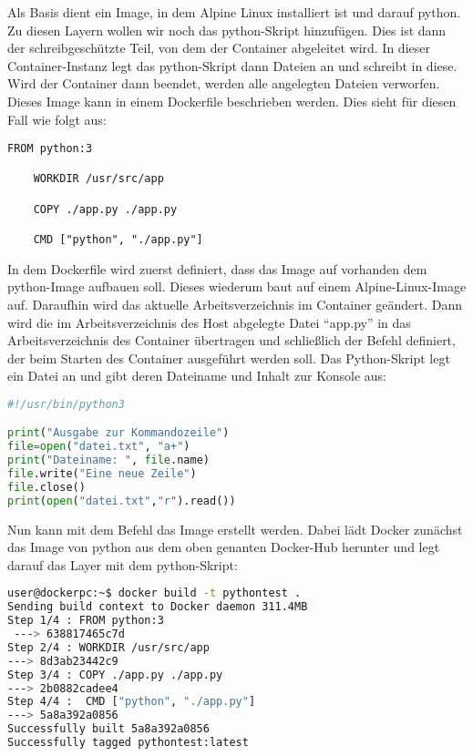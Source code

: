 Als Basis dient ein Image, in dem Alpine Linux installiert ist und darauf python. Zu diesen Layern wollen wir noch das python-Skript hinzufügen. Dies ist dann der schreibgeschützte Teil, von dem der Container abgeleitet wird. In dieser Container-Instanz legt das python-Skript dann Dateien an und schreibt in diese. Wird der Container dann beendet, werden alle angelegten Dateien verworfen.\\
Dieses Image kann in einem Dockerfile beschrieben werden. Dies sieht für diesen Fall wie folgt aus:

\begin{lstlisting}[language=docker,caption={Dockerfile},label={code:dockerfile}]
    FROM python:3
    
    WORKDIR /usr/src/app
    
    COPY ./app.py ./app.py
    
    CMD ["python", "./app.py"]
\end{lstlisting}

In dem Dockerfile wird zuerst definiert, dass das Image auf vorhanden dem python-Image aufbauen soll. Dieses wiederum baut auf einem Alpine-Linux-Image auf. Daraufhin wird das aktuelle Arbeitsverzeichnis im Container geändert. Dann wird die im Arbeitsverzeichnis des Host abgelegte Datei "`app.py"' in das Arbeitsverzeichnis des Container übertragen und schließlich der Befehl definiert, der beim Starten des Container ausgeführt werden soll. Das Python-Skript legt ein Datei an und gibt deren Dateiname und Inhalt zur Konsole aus:
\begin{lstlisting}[language=python,caption={app.py},label={code:pythonapp}]
#!/usr/bin/python3

print("Ausgabe zur Kommandozeile")
file=open("datei.txt", "a+")
print("Dateiname: ", file.name)
file.write("Eine neue Zeile")
file.close()
print(open("datei.txt","r").read())
\end{lstlisting}
Nun kann mit dem Befehl  das Image erstellt werden. Dabei lädt Docker zunächst das Image von python aus dem oben genanten Docker-Hub herunter und legt darauf das Layer mit dem python-Skript:

\begin{lstlisting}[language=bash,caption={Terminalausgabe docker build},label={code:dockerbuild}]
user@dockerpc:~$ docker build -t pythontest .
Sending build context to Docker daemon 311.4MB
Step 1/4 : FROM python:3
 ---> 638817465c7d
Step 2/4 : WORKDIR /usr/src/app
---> 8d3ab23442c9
Step 3/4 : COPY ./app.py ./app.py
---> 2b0882cadee4
Step 4/4 :  CMD ["python", "./app.py"]
---> 5a8a392a0856
Successfully built 5a8a392a0856
Successfully tagged pythontest:latest
\end{lstlisting}

